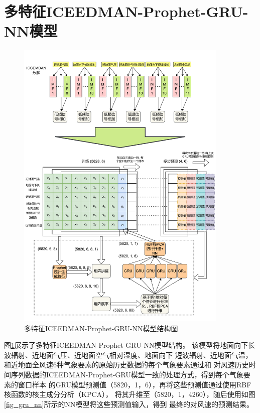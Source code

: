 \documentclass[AutoFakeBold]{LZUThesis}
\begin{document}
\section{多特征ICEEDMAN-Prophet-GRU-NN模型}
\begin{figure}[H]
	\centering
    \includegraphics[width=0.9\textwidth]{figures/ICCEMDAN-Prophet-GRU-All-Features.pdf}
    \caption{多特征ICEEDMAN-Prophet-GRU-NN模型结构图}
    \label{fig_ICCEMDAN_Prophet_GRU_All_Features}
\end{figure}
图\ref{fig_ICCEMDAN_Prophet_GRU_All_Features}展示了多特征ICEEDMAN-Prophet-GRU-NN模型结构。
该模型将地面向下长波辐射、近地面气压、近地面空气相对湿度、地面向下
短波辐射、近地面气温，和近地面全风速6种气象要素的原始历史数据的每个气象要素通过和
对风速历史时间序列数据的ICEEDMAN-Prophet-GRU模型一致的处理方式，得到每个气象要素的窗口样本
的GRU模型预测值（5820，1，6），再将这些预测值通过使用RBF核函数的核主成分分析（KPCA），
将其升维至（5820，1，4260），随后使用如图\ref{fig_gru_nn}所示的NN模型将这些预测值输入，得到
最终的对风速的预测结果。
\end{document}

